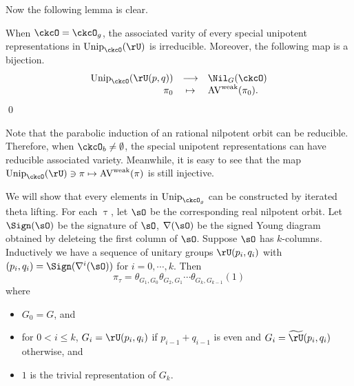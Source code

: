 \documentclass[counting_main.tex]{subfiles}
\begin{document}
Now the following lemma is clear.
\begin{lem}
When $\ckcO=\ckcO_g$, the associated varity of every special unipotent representations in $\Unip_\ckcO(\rU)$
is irreducible. Moreover, the following map  is a bijection.
\[
  \begin{array}{rcl}
  \Unip_{\ckcO}(\rU(p,q)) &\longrightarrow& \Nil_{G}(\ckcO)\\
  \pi_0 & \mapsto & \wAV(\pi_0).
  \end{array}
\]
\qed
\end{lem}
\begin{remark}
  Note that the parabolic induction of an rational nilpotent orbit can be reducible.
  Therefore, when $\ckcO_b\neq \emptyset$, the special unipotent representations can have
  reducible associated variety. Meanwhile, it is easy to see that the map
  $\Unip_{\ckcO}(\rU) \ni \pi \mapsto\wAV(\pi)$ is still injective.
\end{remark}

We will show that every elements in $\Unip_{\ckcO_g}$ can be constructed by iterated theta lifting.
For each $\uptau$, let $\sO$ be the corresponding real nilpotent orbit. Let
$\Sign(\sO)$ be the signature of $\sO$, $\DD(\sO)$ be the signed Young diagram
obtained by deleteing the first column of $\sO$.
Suppose $\sO$ has $k$-columns. Inductively we have a sequence of unitary groups
$\rU(p_i,q_i)$ with $(p_i,q_i) = \Sign(\DD^i(\sO))$ for $i=0, \cdots, k$. Then
\begin{equation}\label{eq:u.U}
  \pi_\tau = \theta_{G_{1},G_{0}} \theta_{G_{2},G_{1}}\cdots \theta_{G_{k},G_{k-1}} (1)
\end{equation}
where
\begin{itemize}
  \item
  $G_{0}=G$, and
  \item for $0<i\leq k$, $G_{i} = \rU(p_{i},q_{i})$ if $p_{i-1}+q_{i-1}$ is even and
 $G_{i} = \tU(p_{i},q_{i})$ otherwise, and
  \item
$1$ is the trivial representation of $G_{k}$.
\end{itemize}


\end{document}
